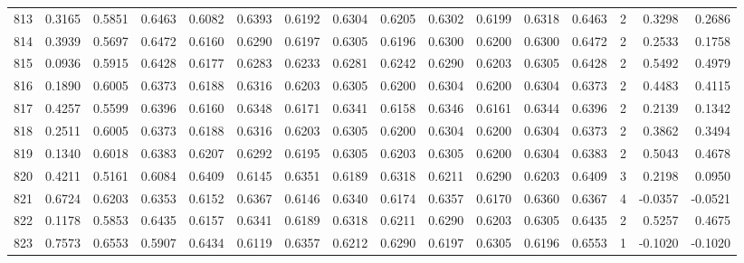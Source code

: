 \begin{tabular}{lrrrrrrrrrrrrrrr}
813 &      0.3165 &  0.5851 &  0.6463 &  0.6082 &  0.6393 &  0.6192 &  0.6304 &  0.6205 &  0.6302 &  0.6199 &   0.6318 &     0.6463 &      2 &                    0.3298 &                     0.2686 \\
814 &      0.3939 &  0.5697 &  0.6472 &  0.6160 &  0.6290 &  0.6197 &  0.6305 &  0.6196 &  0.6300 &  0.6200 &   0.6300 &     0.6472 &      2 &                    0.2533 &                     0.1758 \\
815 &      0.0936 &  0.5915 &  0.6428 &  0.6177 &  0.6283 &  0.6233 &  0.6281 &  0.6242 &  0.6290 &  0.6203 &   0.6305 &     0.6428 &      2 &                    0.5492 &                     0.4979 \\
816 &      0.1890 &  0.6005 &  0.6373 &  0.6188 &  0.6316 &  0.6203 &  0.6305 &  0.6200 &  0.6304 &  0.6200 &   0.6304 &     0.6373 &      2 &                    0.4483 &                     0.4115 \\
817 &      0.4257 &  0.5599 &  0.6396 &  0.6160 &  0.6348 &  0.6171 &  0.6341 &  0.6158 &  0.6346 &  0.6161 &   0.6344 &     0.6396 &      2 &                    0.2139 &                     0.1342 \\
818 &      0.2511 &  0.6005 &  0.6373 &  0.6188 &  0.6316 &  0.6203 &  0.6305 &  0.6200 &  0.6304 &  0.6200 &   0.6304 &     0.6373 &      2 &                    0.3862 &                     0.3494 \\
819 &      0.1340 &  0.6018 &  0.6383 &  0.6207 &  0.6292 &  0.6195 &  0.6305 &  0.6203 &  0.6305 &  0.6200 &   0.6304 &     0.6383 &      2 &                    0.5043 &                     0.4678 \\
820 &      0.4211 &  0.5161 &  0.6084 &  0.6409 &  0.6145 &  0.6351 &  0.6189 &  0.6318 &  0.6211 &  0.6290 &   0.6203 &     0.6409 &      3 &                    0.2198 &                     0.0950 \\
821 &      0.6724 &  0.6203 &  0.6353 &  0.6152 &  0.6367 &  0.6146 &  0.6340 &  0.6174 &  0.6357 &  0.6170 &   0.6360 &     0.6367 &      4 &                   -0.0357 &                    -0.0521 \\
822 &      0.1178 &  0.5853 &  0.6435 &  0.6157 &  0.6341 &  0.6189 &  0.6318 &  0.6211 &  0.6290 &  0.6203 &   0.6305 &     0.6435 &      2 &                    0.5257 &                     0.4675 \\
823 &      0.7573 &  0.6553 &  0.5907 &  0.6434 &  0.6119 &  0.6357 &  0.6212 &  0.6290 &  0.6197 &  0.6305 &   0.6196 &     0.6553 &      1 &                   -0.1020 &                    -0.1020 \\

\end{tabular}
